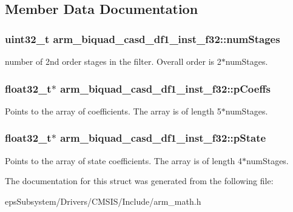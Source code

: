 \subsection{Member Data Documentation}
\hypertarget{structarm__biquad__casd__df1__inst__f32_af69820c37a87252c46453e4cfe120585}{
\subsubsection[{num\-Stages}]{\setlength{\rightskip}{0pt plus 5cm}uint32\-\_\-t arm\-\_\-biquad\-\_\-casd\-\_\-df1\-\_\-inst\-\_\-f32\-::num\-Stages}}\label{structarm__biquad__casd__df1__inst__f32_af69820c37a87252c46453e4cfe120585}
number of 2nd order stages in the filter. Overall order is 2$\ast$num\-Stages. \hypertarget{structarm__biquad__casd__df1__inst__f32_af9df3820576fb921809d1462c9c6d16c}{
\subsubsection[{p\-Coeffs}]{\setlength{\rightskip}{0pt plus 5cm}float32\-\_\-t$\ast$ arm\-\_\-biquad\-\_\-casd\-\_\-df1\-\_\-inst\-\_\-f32\-::p\-Coeffs}}\label{structarm__biquad__casd__df1__inst__f32_af9df3820576fb921809d1462c9c6d16c}
Points to the array of coefficients. The array is of length 5$\ast$num\-Stages. \hypertarget{structarm__biquad__casd__df1__inst__f32_a8c245d79e0d8cfabc82409d4b54fb682}{
\subsubsection[{p\-State}]{\setlength{\rightskip}{0pt plus 5cm}float32\-\_\-t$\ast$ arm\-\_\-biquad\-\_\-casd\-\_\-df1\-\_\-inst\-\_\-f32\-::p\-State}}\label{structarm__biquad__casd__df1__inst__f32_a8c245d79e0d8cfabc82409d4b54fb682}
Points to the array of state coefficients. The array is of length 4$\ast$num\-Stages. 

The documentation for this struct was generated from the following file\-:\begin{DoxyCompactItemize}
\item 
eps\-Subsystem/\-Drivers/\-C\-M\-S\-I\-S/\-Include/arm\-\_\-math.\-h\end{DoxyCompactItemize}
